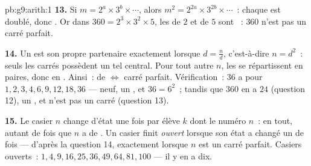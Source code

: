 \begin{solution}{pb:g9:arith:1}
\textbf{13.} Si $m = 2^{a} \times 3^{b} \times \cdots$, alors
$m^2 = 2^{2a} \times 3^{2b} \times \cdots$~: chaque  est
doublé, donc . Or dans $360 = 2^3 \times 3^2 \times 5$, les
 de $2$ et de $5$ sont ~: $360$ n'est pas un carré
parfait.

\textbf{14.} Un  est son propre partenaire exactement
lorsque $d = \frac nd$, c'est-à-dire $n = d^2$~: seuls les carrés
possèdent un tel  central. Pour tout autre $n$, les
 se répartissent en paires, donc en . Ainsi~:
 de  $\Leftrightarrow$ carré parfait.
Vérification~: $36$ a pour 
$1, 2, 3, 4, 6, 9, 12, 18, 36$ --- neuf, un , et
$36 = 6^2$~; tandis que $360$ en a $24$ (question 12), un , et n'est pas un carré (question 13).

\textbf{15.} Le casier $n$ change d'état une fois par élève $k$
dont le numéro  $n$~: en tout, autant de fois que $n$ a de
. Un casier finit \emph{ouvert} lorsque son état a changé
un  de fois --- d'après la question 14, exactement
lorsque $n$ est un carré parfait. Casiers ouverts~:
$1, 4, 9, 16, 25, 36, 49, 64, 81, 100$ --- il y en a dix.
\end{solution}
